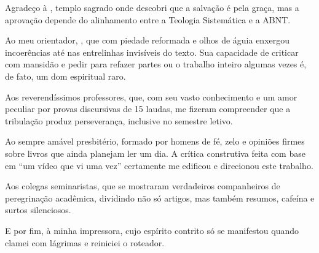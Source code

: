 \begin{agradecimentos}

Agradeço à \textbf{\imprimirinstituicao}, templo sagrado onde descobri que a salvação é pela graça, mas a aprovação depende do alinhamento entre a Teologia Sistemática e a ABNT.

Ao meu orientador, \imprimirorientador, que com piedade reformada e olhos de águia enxergou incoerências até nas entrelinhas invisíveis do texto. Sua capacidade de criticar com mansidão e pedir para refazer partes ou o trabalho inteiro algumas vezes é, de fato, um dom espiritual raro.

Aos reverendíssimos professores, que, com seu vasto conhecimento e um amor peculiar por provas discursivas de 15 laudas, me fizeram compreender que a tribulação produz perseverança, inclusive no semestre letivo.

Ao sempre amável presbitério, formado por homens de fé, zelo e opiniões firmes sobre livros que ainda planejam ler um dia. A crítica construtiva feita com base em ``um vídeo que vi uma vez'' certamente me edificou e direcionou este trabalho.

Aos colegas seminaristas, que se mostraram verdadeiros companheiros de peregrinação acadêmica, dividindo não só artigos, mas também resumos, cafeína e surtos silenciosos.

E por fim, à minha impressora, cujo espírito contrito só se manifestou quando clamei com lágrimas e reiniciei o roteador.
\end{agradecimentos}